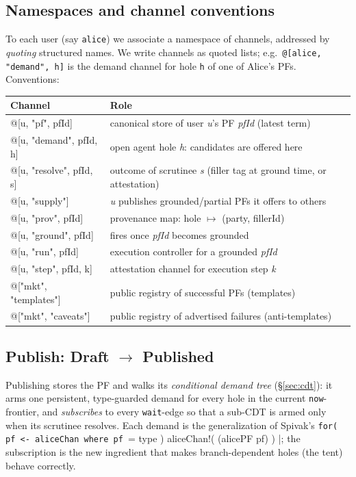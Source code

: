 \documentclass[11pt]{article}
\newcommand{\code}[1]{\lstinline[language=rho,basicstyle=\ttfamily\small]|#1|}
\begin{document}
\subsection{Namespaces and channel conventions}\label{sec:ns}
To each user (say \code{alice}) we associate a namespace of channels, addressed by \emph{quoting}
structured names. We write channels as quoted lists; e.g.\ \code{@[alice, "demand", h]} is the demand
channel for hole \code{h} of one of Alice's PFs. Conventions:

\begin{center}\small
\renewcommand{\arraystretch}{1.25}
\begin{tabular}{@{}>{\ttfamily}l l@{}}
\toprule
\normalfont\textbf{Channel} & \textbf{Role} \\
\midrule
@[u, "pf", pfId]            & canonical store of user \textit{u}'s PF \textit{pfId} (latest term) \\
@[u, "demand", pfId, h]    & open agent hole \textit{h}: candidates are offered here \\
@[u, "resolve", pfId, s]   & outcome of scrutinee \textit{s} (filler tag at ground time, or attestation) \\
@[u, "supply"]             & \textit{u} publishes grounded/partial PFs it offers to others \\
@[u, "prov", pfId]         & provenance map: hole $\mapsto$ (party, fillerId) \\
@[u, "ground", pfId]       & fires once \textit{pfId} becomes grounded \\
@[u, "run", pfId]          & execution controller for a grounded \textit{pfId} \\
@[u, "step", pfId, k]      & attestation channel for execution step \textit{k} \\
@["mkt", "templates"]      & public registry of successful PFs (templates) \\
@["mkt", "caveats"]        & public registry of advertised failures (anti-templates) \\
\bottomrule
\end{tabular}
\end{center}

\subsection{Publish: Draft $\to$ Published}\label{sec:publish}
Publishing stores the PF and walks its \emph{conditional demand tree} (\S\ref{sec:cdt}): it arms one
persistent, type-guarded demand for every hole in the current \code{now}-frontier, and \emph{subscribes}
to every \code{wait}-edge so that a sub-CDT is armed only when its scrutinee resolves. Each demand is
the generalization of Spivak's
\code{for( pf <- aliceChan where pf |= type ){ aliceChan!( (alicePF pf) ) }}; the subscription is the
new ingredient that makes branch-dependent holes (the tent) behave correctly.
\end{document}
